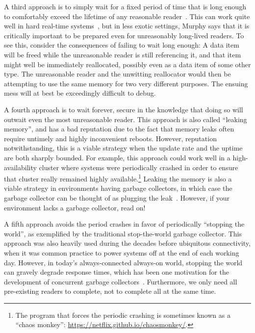 A third approach is to simply wait for a fixed period of time that is
long enough to comfortably exceed the lifetime of any reasonable
reader~\cite{Jacobson93,AjuJohn95}.
This can work quite well in hard real-time systems~\cite{YuxinRen2018RTRCU},
but in less exotic
settings, Murphy says that it is critically important to be prepared
even for unreasonably long-lived readers.
To see this, consider the consequences of failing to wait long enough:
A data item will be freed while the unreasonable reader is still
referencing it, and that item might well be immediately reallocated,
possibly even as a data item of some other type.
The unreasonable reader and the unwitting reallocator would then
be attempting to use the same memory for two very different purposes.
The ensuing mess will at best be exceedingly difficult to debug.

A fourth approach is to wait forever, secure in the knowledge that
doing so will outwait even the most unreasonable reader.
This approach is also called ``leaking memory'', and has a bad reputation
due to the fact that memory leaks often require untimely and
highly inconvenient reboots.
However, reputation notwithstanding, this is a viable strategy when
the update rate and the uptime are both sharply bounded.
For example, this approach could work well in a high-availability
cluster where systems were periodically crashed in order to ensure
that cluster really remained highly available.\footnote{
	The program that forces the periodic crashing is sometimes
	known as a ``chaos monkey'':
	\url{https://netflix.github.io/chaosmonkey/}.}
Leaking the memory is also a viable strategy in environments having
garbage collectors, in which case the garbage collector can be thought
of as plugging the leak~\cite{Kung80}.
However, if your environment lacks a garbage collector, read on!

A fifth approach avoids the period crashes in favor of periodically
``stopping the world'', as exemplified by the traditional stop-the-world
garbage collector.
This approach was also heavily used during the decades before
ubiquitous connectivity, when it was common practice to power systems
off at the end of each working day.
However, in today's always-connected always-on world, stopping the world
can gravely degrade response times, which has been one motivation for the
development of concurrent garbage collectors~\cite{DavidFBacon2003RTGC}.
Furthermore, we only need all pre-existing readers to complete, not to
complete all at the same time.

